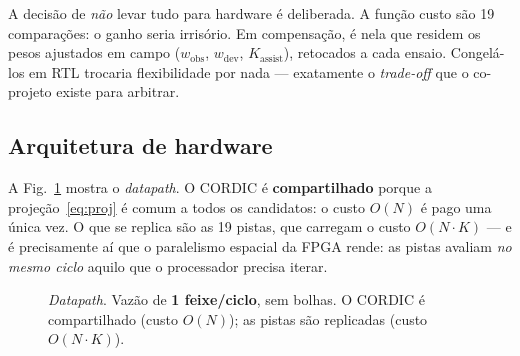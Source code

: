 \documentclass[conference]{IEEEtran}
\begin{document}
A decis\~ao de \emph{n\~ao} levar tudo para hardware \'e deliberada. A fun\c{c}\~ao
custo s\~ao \num{19} compara\c{c}\~oes: o ganho seria irris\'orio. Em compensa\c{c}\~ao,
\'e nela que residem os pesos ajustados em campo ($w_{\text{obs}}$,
$w_{\text{dev}}$, $K_{\text{assist}}$), retocados a cada ensaio. Congel\'a-los em
RTL trocaria flexibilidade por nada --- exatamente o \emph{trade-off} que o
co-projeto existe para arbitrar.

\subsection{Arquitetura de hardware}

A Fig.~\ref{fig:arq} mostra o \emph{datapath}. O CORDIC \'e \textbf{compartilhado}
porque a proje\c{c}\~ao~\eqref{eq:proj} \'e comum a todos os candidatos: o custo
$O(N)$ \'e pago uma \'unica vez. O que se replica s\~ao as \num{19} pistas, que
carregam o custo $O(N\cdot K)$ --- e \'e precisamente a\'i que o paralelismo
espacial da FPGA rende: as pistas avaliam \emph{no mesmo ciclo} aquilo que o
processador precisa iterar.

\begin{figure}[!t]
\centering
{}
\caption{\emph{Datapath}. Vaz\~ao de \textbf{1 feixe/ciclo}, sem bolhas. O CORDIC
\'e compartilhado (custo $O(N)$); as pistas s\~ao replicadas (custo $O(N\cdot K)$).}
\label{fig:arq}
\end{figure}
\end{document}
